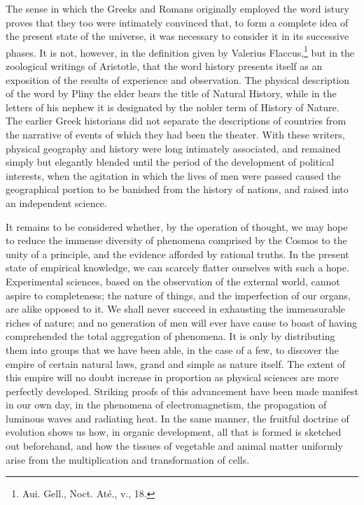 The sense in which the Greeks and Romans originally employed the word istury proves that they too were intimately convinced that, to form a complete idea of the present state of the universe, it was necessary to consider it in its successive phases. It is not, however, in the definition given by Valerius Flaccus,\footnote{Aui. Gell., Noct. At\'{e}., v., 18.} but in the zoological writings of Aristotle, that the word history presents itself as an exposition of the results of experience and observation. The physical description of the word by Pliny the elder bears the title of Natural History, while in the letters of his nephew it is designated by the nobler term of History of Nature. The earlier Greek historians did not separate the descriptions of countries from the narrative of events of which they had been the theater. With these writers, physical geography and history were long intimately associated, and remained simply but elegantly blended until the period of the development of political interests, when the agitation in which the lives of men were passed caused the geographical portion to be banished from the history of nations, and raised into an independent science.

It remains to be considered whether, by the operation of thought, we may hope to reduce the immense diversity of phenomena comprised by the Cosmos to the unity of a principle, and the evidence afforded by rational truths. In the present state of empirical knowledge, we can scarcely flatter ourselves with such a hope. Experimental sciences, based on the observation of the external world, cannot aspire to completeness; the nature of things, and the imperfection of our organs, are alike opposed to it. We shall never succeed in exhausting the immeasurable riches of nature; and no generation of men will ever have cause to boast of having comprehended the total aggregation of phenomena. It is only by distributing them into groups that we have been able, in the case of a few, to discover the empire of certain natural laws, grand and simple as nature itself. The extent of this empire will no doubt increase in proportion as physical sciences are more perfectly developed. Striking proofs of this advancement have been made manifest in our own day, in the phenomena of electromagnetism, the propagation of luminous waves and radiating heat. In the same manner, the fruitful doctrine of evolution shows us how, in organic development, all that is formed is sketched out beforehand, and how the tissues of vegetable and animal matter uniformly arise from the multiplication and transformation of cells.

